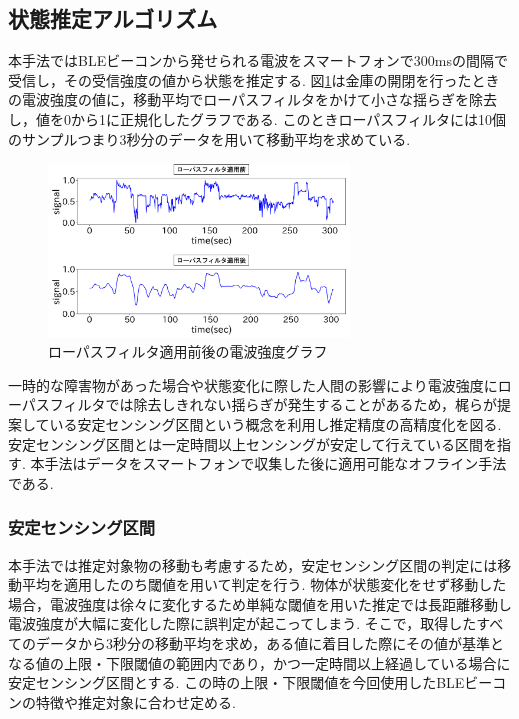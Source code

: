 \documentclass[Japanese]{dicomopapers}
\begin{document}

\subsection{状態推定アルゴリズム}
本手法ではBLEビーコンから発せられる電波をスマートフォンで300msの間隔で受信し，その受信強度の値から状態を推定する.
図\ref{bank-opcl}は金庫の開閉を行ったときの電波強度の値に，移動平均でローパスフィルタをかけて小さな揺らぎを除去し，値を0から1に正規化したグラフである.
このときローパスフィルタには10個のサンプルつまり3秒分のデータを用いて移動平均を求めている.


\begin{figure}[tbh]
 \centering
 \includegraphics[width=8cm]{lowpath_compare.png}
 \caption{ローパスフィルタ適用前後の電波強度グラフ}
 \label{bank-opcl}
\end{figure}


一時的な障害物があった場合や状態変化に際した人間の影響により電波強度にローパスフィルタでは除去しきれない揺らぎが発生することがあるため，梶ら\cite{sensing-area}が提案している安定センシング区間という概念を利用し推定精度の高精度化を図る.
安定センシング区間とは一定時間以上センシングが安定して行えている区間を指す.
本手法はデータをスマートフォンで収集した後に適用可能なオフライン手法である.


\subsubsection{安定センシング区間}
本手法では推定対象物の移動も考慮するため，安定センシング区間の判定には移動平均を適用したのち閾値を用いて判定を行う.
物体が状態変化をせず移動した場合，電波強度は徐々に変化するため単純な閾値を用いた推定では長距離移動し電波強度が大幅に変化した際に誤判定が起こってしまう.
そこで，取得したすべてのデータから3秒分の移動平均を求め，ある値に着目した際にその値が基準となる値の上限・下限閾値の範囲内であり，かつ一定時間以上経過している場合に安定センシング区間とする.
この時の上限・下限閾値を今回使用したBLEビーコンの特徴や推定対象に合わせ定める.
\end{document}
